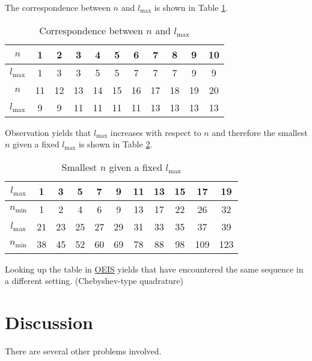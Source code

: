 \documentclass[english, nochinese]{../textmpls/pkupaper}
\begin{document}
The correspondence between $n$ and $l_{\text{max}}$ is shown in Table \ref{Tbl:MaxL}.

\begin{table}[htbp]
\centering
\caption{Correspondence between $n$ and $l_{\text{max}}$}
\label{Tbl:MaxL}
\begin{tabular}{|c|c|c|c|c|c|c|c|c|c|c|}
\hline
$n$ & 1 & 2 & 3 & 4 & 5 & 6 & 7 & 8 & 9 & 10 \\
\hline
$l_{\text{max}}$ & 1 & 3 & 3 & 5 & 5 & 7 & 7 & 7 & 9 & 9 \\
\hline
$n$ & 11 & 12 & 13 & 14 & 15 & 16 & 17 & 18 & 19 & 20 \\
\hline
$l_{\text{max}}$ & 9 & 9 & 11 & 11 & 11 & 11 & 13 & 13 & 13 & 13 \\
\hline
\end{tabular}
\end{table}

Observation yields that $l_{\text{max}}$ increases with respect to $n$ and therefore the smallest $n$ given a fixed $l_{\text{max}}$ is shown in Table \ref{Tbl:MinN}.

\begin{table}[htbp]
\centering
\caption{Smallest $n$ given a fixed $l_{\text{max}}$}
\label{Tbl:MinN}
\begin{tabular}{|c|c|c|c|c|c|c|c|c|c|c|}
\hline
$l_{\text{max}}$ & 1 & 3 & 5 & 7 & 9 & 11 & 13 & 15 & 17 & 19 \\
\hline
$n_{\text{min}}$ & 1 & 2 & 4 & 6 & 9 & 13 & 17 & 22 & 26 & 32 \\
\hline
$l_{\text{max}}$ & 21 & 23 & 25 & 27 & 29 & 31 & 33 & 35 & 37 & 39 \\
\hline
$n_{\text{min}}$ & 38 & 45 & 52 & 60 & 69 & 78 & 88 & 98 & 109 & 123 \\
\hline    
\end{tabular}
\end{table}

Looking up the table in \href{https://oeis.org/A129337}{OEIS} yields that \parencite{forster_weighted_1986} have encountered the same sequence in a different setting. (Chebyshev-type quadrature)

\section{Discussion}

There are several other problems involved.
\end{document}
